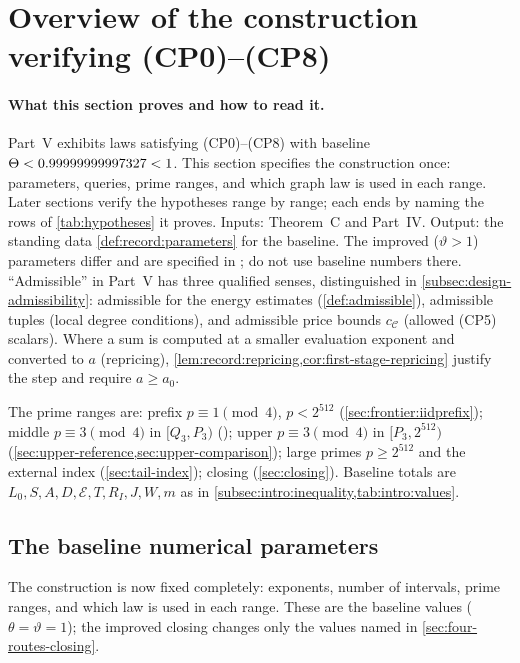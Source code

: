 \section{Overview of the construction verifying (CP0)--(CP8)}\label{sec:design}

\paragraph{What this section proves and how to read it.}
Part~V exhibits laws satisfying (CP0)--(CP8) with baseline
$\Theta<0.99999999997327<1$. This section specifies the construction once:
parameters, queries, prime ranges, and which graph law is used in
each range. Later sections verify the hypotheses range by range;
each ends by naming the rows of \cref{tab:hypotheses} it proves.
Inputs: Theorem~C and Part~IV. Output: the standing data
\cref{def:record:parameters} for the baseline. The improved
($\vartheta>1$) parameters differ and are specified in
;
do not use baseline numbers there. ``Admissible'' in Part~V has
three qualified senses, distinguished in
\cref{subsec:design-admissibility}: admissible for the energy
estimates (\cref{def:admissible}), admissible tuples (local degree
conditions), and admissible price bounds $c_{\mathcal C}$ (allowed
(CP5) scalars). Where a sum is computed at a smaller evaluation
exponent and converted to $a$ (repricing),
\cref{lem:record:repricing,cor:first-stage-repricing} justify the step
and require $a\ge a_0$.

The prime ranges are: prefix $p\equiv1\pmod4$, $p<2^{512}$
(\cref{sec:frontier:iidprefix}); middle $p\equiv3\pmod4$ in
$[Q_3,P_3)$ ();
upper $p\equiv3\pmod4$ in $[P_3,2^{512})$
(\cref{sec:upper-reference,sec:upper-comparison}); large primes
$p\ge2^{512}$ and the external index (\cref{sec:tail-index}); closing
(\cref{sec:closing}). Baseline totals are
$L_0,S,A,D,\mathcal E,T,R_I,J,W,m$ as in
\cref{subsec:intro:inequality,tab:intro:values}.

\subsection{The baseline numerical parameters}\label{subsec:design-parameters}

The construction is now fixed completely: exponents, number of
intervals, prime ranges, and which law is used in each range.
These are the baseline values ($\theta=\vartheta=1$); the improved
closing changes only the values named in
\cref{sec:four-routes-closing}.

